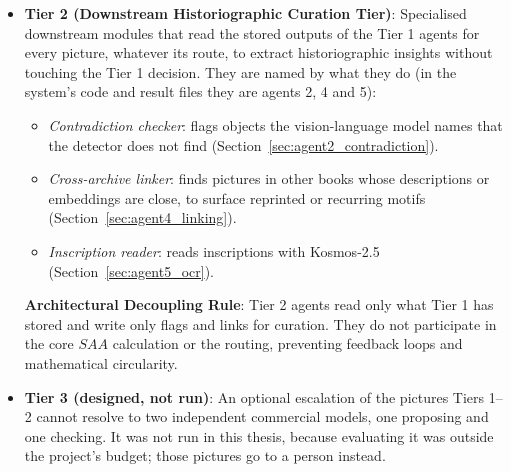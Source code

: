\documentclass[12pt,a4paper]{report}
\begin{document}
\begin{itemize}
    \paragraph{Which object and scene classes are covered.} The detector was trained on ten object classes. Every evaluation in this thesis reports the eight that the human boxes and the detector share: \textit{person, child, animal, building, weapon, vehicle, tree, text} (horses are merged into \textit{animal}; the rater's \textit{furniture} and \textit{hat} boxes never reached the label files). The scene classifier is zero-shot, but it is evaluated against five scene types: \textit{drawing, landscape, family, playing, teaching}.

    \item \textbf{Tier 2 (Downstream Historiographic Curation Tier)}: Specialised downstream modules that read the stored outputs of the Tier 1 agents for every picture, whatever its route, to extract historiographic insights without touching the Tier 1 decision. They are named by what they do (in the system's code and result files they are agents 2, 4 and 5):
    \begin{itemize}
        \item \textit{Contradiction checker}: flags objects the vision-language model names that the detector does not find (Section~\ref{sec:agent2_contradiction}).
        \item \textit{Cross-archive linker}: finds pictures in other books whose descriptions or embeddings are close, to surface reprinted or recurring motifs (Section~\ref{sec:agent4_linking}).
        \item \textit{Inscription reader}: reads inscriptions with Kosmos-2.5 (Section~\ref{sec:agent5_ocr}).
    \end{itemize}
    \begin{flushleft}
    \textbf{Architectural Decoupling Rule}: Tier 2 agents read only what Tier 1 has stored and write only flags and links for curation. They do not participate in the core $SAA$ calculation or the routing, preventing feedback loops and mathematical circularity.
    \end{flushleft}
    
    \item \textbf{Tier 3 (designed, not run)}: An optional escalation of the pictures Tiers 1--2 cannot resolve to two independent commercial models, one proposing and one checking. It was not run in this thesis, because evaluating it was outside the project's budget; those pictures go to a person instead.
\end{itemize}
\end{document}
